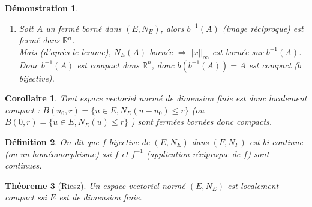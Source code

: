 \documentclass[a4paper, oneside]{report}
\theoremstyle{break}
\newtheorem{thm}{Théoreme}[section] %
\newtheorem{defi}[thm]{Définition}
\newtheorem{cor}[thm]{Corollaire}
\newtheorem*{demo}{Démonstration}
\newcommand{\R}{\mathbb{R}}
\newcommand{\evn}{espace vectoriel normé }
\begin{document}
\begin{demo}
\begin{enumerate}
\item Soit $A$ un fermé borné dans $(E,N_E)$, alors $b^{-1}(A)$ (image réciproque) est fermé dans $\R^n$.\\
Mais (d'après le lemme), $N_E(A)$ bornée $\Rightarrow ||x||_\infty$  est bornée sur $b^{-1}(A)$.\\
Donc $b^{-1}(A)$ est compact dans $\R^n$, donc $b(b^{-1}(A))=A$ est compact ($b$ bijective).
\end{enumerate}

\end{demo}


\begin{cor}
Tout \evn de dimension finie est donc localement compact : $\bar{B}(u_0,r) = \{u\in E, N_E(u-u_0) \leq r \}$ (ou $\bar{B}(0,r) = \{u\in E, N_E(u) \leq r \}$ ) sont fermées bornées donc compacts.

\end{cor}

\begin{defi}
On dit que $f$ bijective de $(E,N_E)$ dans $(F,N_F)$ est bi-continue (ou un homéomorphisme) ssi $f$ et $f^{-1}$ (application réciproque de $f$) sont continues.
\end{defi}

\begin{thm}[Riesz]

Un \evn $(E,N_E)$ est localement compact ssi $E$ est de dimension finie.
\end{thm}
\end{document}
